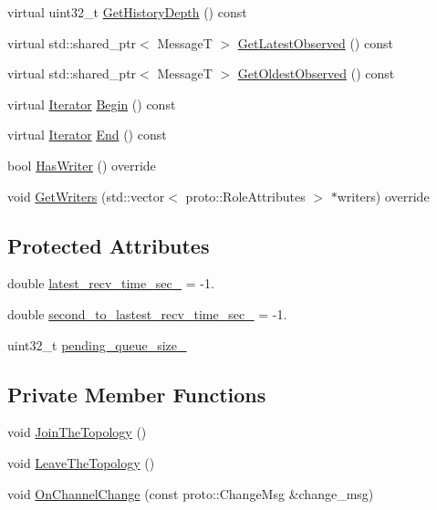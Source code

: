 \begin{DoxyCompactItemize}
virtual uint32\-\_\-t \hyperlink{classapollo_1_1cyber_1_1Reader_a6e1d8dd73f052175e1599286f54ba80c}{Get\-History\-Depth} () const 
\item 
virtual std\-::shared\-\_\-ptr$<$ Message\-T $>$ \hyperlink{classapollo_1_1cyber_1_1Reader_ac3fabcbcb3eac7570fc719f07cdaac27}{Get\-Latest\-Observed} () const 
\item 
virtual std\-::shared\-\_\-ptr$<$ Message\-T $>$ \hyperlink{classapollo_1_1cyber_1_1Reader_a787bb122252d2e2a86fdb04a81d6beca}{Get\-Oldest\-Observed} () const 
\item 
virtual \hyperlink{classapollo_1_1cyber_1_1Reader_a54b26f524fb24d2b90fc9fb6fa908bf3}{Iterator} \hyperlink{classapollo_1_1cyber_1_1Reader_a5fff77810d6a55099b507eb9e4a6135c}{Begin} () const 
\item 
virtual \hyperlink{classapollo_1_1cyber_1_1Reader_a54b26f524fb24d2b90fc9fb6fa908bf3}{Iterator} \hyperlink{classapollo_1_1cyber_1_1Reader_a1e670b90e2896b668b8061860d6e953f}{End} () const 
\item 
bool \hyperlink{classapollo_1_1cyber_1_1Reader_a9fc3587c84ebe1e483b12c2c91314786}{Has\-Writer} () override
\item 
void \hyperlink{classapollo_1_1cyber_1_1Reader_a5d2fe028b8ba545a07621d8412a6df95}{Get\-Writers} (std\-::vector$<$ proto\-::\-Role\-Attributes $>$ $\ast$writers) override
\end{DoxyCompactItemize}
\subsection*{Protected Attributes}
\begin{DoxyCompactItemize}
\item 
double \hyperlink{classapollo_1_1cyber_1_1Reader_a88776a4339f254a9907c5821f6d1a272}{latest\-\_\-recv\-\_\-time\-\_\-sec\-\_\-} = -\/1.
\item 
double \hyperlink{classapollo_1_1cyber_1_1Reader_ac3a5475b325e2934669803280370c2f3}{second\-\_\-to\-\_\-lastest\-\_\-recv\-\_\-time\-\_\-sec\-\_\-} = -\/1.
\item 
uint32\-\_\-t \hyperlink{classapollo_1_1cyber_1_1Reader_a87f1ff71f13f5fee1e4b93b58da506d4}{pending\-\_\-queue\-\_\-size\-\_\-}
\end{DoxyCompactItemize}
\subsection*{Private Member Functions}
\begin{DoxyCompactItemize}
\item 
void \hyperlink{classapollo_1_1cyber_1_1Reader_a8c67ce6692d46409a84fae9e2c54c1c1}{Join\-The\-Topology} ()
\item 
void \hyperlink{classapollo_1_1cyber_1_1Reader_ab5777ec9af26900f6612784f1dc495e3}{Leave\-The\-Topology} ()
\item 
void \hyperlink{classapollo_1_1cyber_1_1Reader_aa30e67d61e535efc7ea932d01319e02e}{On\-Channel\-Change} (const proto\-::\-Change\-Msg \&change\-\_\-msg)
\end{DoxyCompactItemize}
